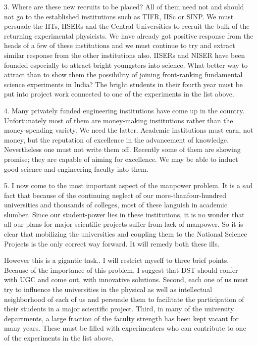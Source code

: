 3. Where are these new recruits to be placed? All of them need not and
should not go to the established institutions such as TIFR, IISc or SINP. We
must persuade the IITs, IISERs and the Central Universities to recruit the
bulk of the returning experimental physicists. We have already got positive
response from the heads of a few of these institutions and we must continue
to try and extract similar response from the other institutions also. IISERs
and NISER have been founded especially to attract bright youngsters into
science. What better way to attract than to show them the possibility of
joining front-ranking fundamental science experiments in India? The bright
students in their fourth year must be put into project work connected to one
of the experiments in the list above. 


4. Many privately funded engineering institutions have come up in the
country. Unfortunately most of them are money-making institutions rather
than the money-spending variety. We need the latter. Academic institutions
must earn, not money, but the reputation of excellence in the advancement
of knowledge. Nevertheless one must not write them off. Recently some of
them are showing promise; they are capable of aiming for excellence. We
may be able to induct good science and engineering faculty into them. 


5. I now come to the most important aspect of the manpower problem.
It is a sad fact that because of the continuing neglect of our more-thanfour-hundred universities and thousands of colleges, most of these languish
in academic slumber. Since our student-power lies in these institutions, it
is no wonder that all our plans for major scientific projects suffer from lack
of manpower. So it is clear that mobilizing the universities and coupling
them to the National Science Projects is the only correct way forward. It
will remedy both these ills. 


However this is a gigantic task.. I will restrict myself to three brief points.
Because of the importance of this problem, I suggest that DST should confer
with UGC and come out, with innovative solutions. Second, each one of us
must try to influence the universities in the physical as well as intellectual
neighborhood of each of us and persuade them to facilitate the participation
of their students in a major scientific project. Third, in many of the university
departments, a large fraction of the faculty strength has been kept vacant
for many years. These must be filled with experimenters who can contribute
to one of the experiments in the list above. 


